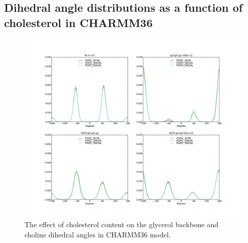 \documentclass[journal=jacsat,manuscript=article]{achemso}
\begin{document}
\subsection{Dihedral angle distributions as a function of cholesterol in CHARMM36}
\begin{figure}[]
  \centering
  \includegraphics[width=17.2cm]{../Fig/dihsCHOLcharmm.pdf}
  \caption{\label{dihsCHOLcharmm}
    The effect of cholesterol content on the glycerol backbone and choline dihedral angles in CHARMM36 model.}
\end{figure}
\end{document}
